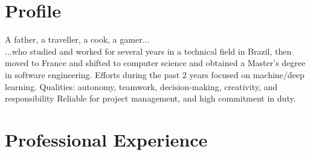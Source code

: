 \documentclass[letterpaper]{twentysecondcv} %
\begin{document}
\makeprofile %


\section{Profile}

A father, a traveller, a cook, a gamer... \\ ...who studied and
worked for several years in a technical field in Brazil, then moved to France
and shifted to computer science and obtained a Master’s degree in software
engineering. Efforts during the past 2 years focused on machine/deep learning.
Qualities: autonomy, teamwork, decision-making, creativity, and responsibility
Reliable for project management, and high commitment in duty.





\section{Professional Experience}
\end{document}
